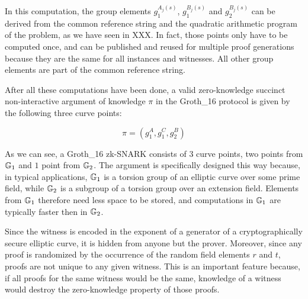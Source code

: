 In this computation, the group elements $g_1^{A_j(s)}$, $g_1^{B_j(s)}$ and $g_2^{B_j(s)}$ can be derived from the common reference string and the quadratic arithmetic program of the problem, as we have seen in XXX. In fact, those points only have to be computed once, and can be published and reused for multiple proof generations because they are the same for all instances and witnesses. All other group elements are part of the common reference string. 

After all these computations have been done, a valid zero-knowledge succinct non-interactive argument of knowledge $\pi$ in the Groth\_16 protocol is given by the following three curve points:

\begin{equation}
\pi = (g_1^A,g_1^C,g_2^B)
\end{equation}

As we can see, a Groth\_16 zk-SNARK consists of $3$ curve points, two points from $\mathbb{G}_1$ and $1$ point from $\mathbb{G}_2$. The argument is specifically designed this way because, in typical applications, $\mathbb{G}_1$ is a torsion group of an elliptic curve over some prime field, while $\mathbb{G}_2$ is a subgroup of a torsion group over an extension field. Elements from $\mathbb{G}_1$ therefore need less space to be stored, and computations in $\mathbb{G}_1$ are typically faster then in $\mathbb{G}_2$.

Since the witness is encoded in the exponent of a generator of a cryptographically secure elliptic curve, it is hidden from anyone but the prover. Moreover, since any proof is randomized by the occurrence of the random field elements $r$ and $t$, proofs are not unique to any given witness. This is an important feature because, if all proofs for the same witness would be the same, knowledge of a witness would destroy the zero-knowledge property of those proofs. 

